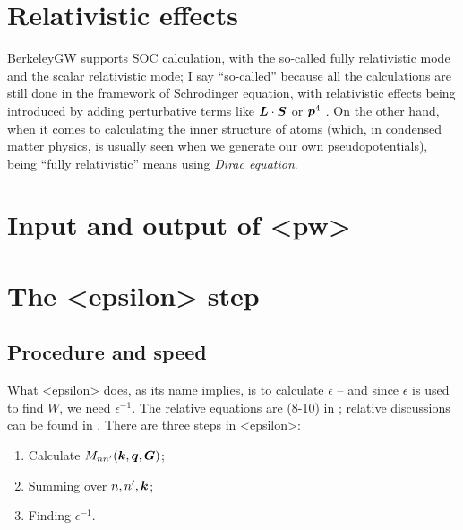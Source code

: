 \documentclass[hyperref, a4paper, 12pt]{report}
\def\texttt#1{<#1>}%
\newcommand{\shortcode}[1]{\texttt{#1}}
\begin{document}
\section{Relativistic effects}

BerkeleyGW supports SOC calculation, 
with the so-called fully relativistic mode 
and the scalar relativistic mode;
I say ``so-called'' because all the calculations are still done 
in the framework of Schrodinger equation,
with relativistic effects being introduced by 
adding perturbative terms like $\vb*{L} \cdot \vb*{S}$ or $\vb*{p}^4$ \cite{barker2022spinor}.
On the other hand, when it comes to calculating the inner structure of atoms 
(which, in condensed matter physics,
is usually seen when we generate our own pseudopotentials),
being ``fully relativistic'' means using \emph{Dirac equation}.

\section{Input and output of \shortcode{pw}}

\section{The \shortcode{epsilon} step}

\subsection{Procedure and speed}\label{sec:epsilon.procedure-speed}

What \shortcode{epsilon} does, 
as its name implies, is to calculate $\epsilon$ --
and since $\epsilon$ is used to find $W$,
we need $\epsilon^{-1}$.
The relative equations are (8-10) in \cite{berkeleygw};
relative discussions can be found in .
There are three steps in \shortcode{epsilon}:
\begin{enumerate}
    \item Calculate $M_{nn'}(\vb*{k}, \vb*{q}, \vb*{G})$;
    \item Summing over $n, n', \vb*{k}$;
    \item Finding $\epsilon^{-1}$.
\end{enumerate}
\end{document}
